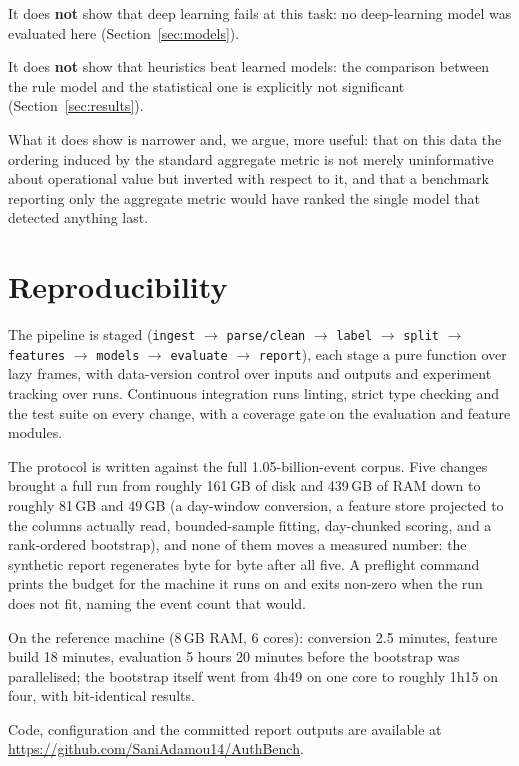 \documentclass[11pt,a4paper]{article}
\begin{document}
It does \textbf{not} show that deep learning fails at this task: no
deep-learning model was evaluated here (Section~\ref{sec:models}).

It does \textbf{not} show that heuristics beat learned models: the comparison
between the rule model and the statistical one is explicitly not significant
(Section~\ref{sec:results}).

What it does show is narrower and, we argue, more useful: that on this data the
ordering induced by the standard aggregate metric is not merely uninformative
about operational value but inverted with respect to it, and that a benchmark
reporting only the aggregate metric would have ranked the single model that
detected anything last.

\section{Reproducibility}

The pipeline is staged (\texttt{ingest} $\to$ \texttt{parse/clean} $\to$
\texttt{label} $\to$ \texttt{split} $\to$ \texttt{features} $\to$
\texttt{models} $\to$ \texttt{evaluate} $\to$ \texttt{report}), each stage a pure
function over lazy frames, with data-version control over inputs and outputs and
experiment tracking over runs. Continuous integration runs linting, strict type
checking and the test suite on every change, with a coverage gate on the
evaluation and feature modules.

The protocol is written against the full 1.05-billion-event corpus. Five changes
brought a full run from roughly 161\,GB of disk and 439\,GB of RAM down to
roughly 81\,GB and 49\,GB (a day-window conversion, a feature store projected
to the columns actually read, bounded-sample fitting, day-chunked scoring, and a
rank-ordered bootstrap), and none of them moves a measured number: the
synthetic report regenerates byte for byte after all five. A preflight command
prints the budget for the machine it runs on and exits non-zero when the run does
not fit, naming the event count that would.

On the reference machine (8\,GB RAM, 6 cores): conversion 2.5 minutes, feature
build 18 minutes, evaluation 5 hours 20 minutes before the bootstrap was
parallelised; the bootstrap itself went from 4h49 on one core to roughly 1h15 on
four, with bit-identical results.

Code, configuration and the committed report outputs are available at
\url{https://github.com/SaniAdamou14/AuthBench}.
\end{document}

